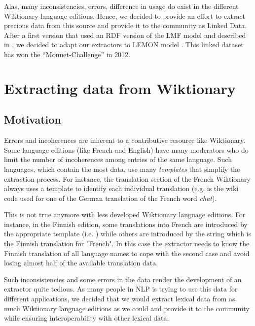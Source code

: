 \documentclass[sw]{iosart2c}
\newcommand{\ffbox}[1]{%
  {%
   \setlength{\fboxsep}{-2\fboxrule}%
   \fbox{\hspace{1.2pt}\strut#1\hspace{1.2pt}}%
  }%
}
\begin{document}
Alas, many inconsistencies, errors, difference in usage do exist in the different Wiktionary language editions. Hence, we decided to provide an effort to extract precious data from this source and provide it to the community as Linked Data. After a first version that used an RDF version of the LMF model \cite{FRANCOPOULO:2006:INRIA-00121468:1,francopoulo-EtAl:2006:MLRI} and described in \cite{serasset:lrec2012}, we decided to adapt our extractors to LEMON model \cite{McRae-lemon:2012}. This linked dataset has won the ``Monnet-Challenge'' in 2012.

\section{Extracting data from Wiktionary}

\subsection{Motivation}

Errors and incoherences are inherent to a contributive resource like Wiktionary. Some language editions (like French and English) have many moderators who do limit the number of incoherences among entries of the same language. Such languages, which contain the most data, use many \textit{templates} that simplify the extraction process. For instance, the translation section of the French Wiktionary always uses a template to identify each individual translation (e.g. \ffbox{\texttt{\small \{\{trad+|de|Katze\}\} ''f''}} is the wiki code used for one of the German translation of the French word \emph{chat}).

This is not true anymore with less developed Wiktionary language editions. For instance, in the Finnish edition, some translations into French are introduced by the appropriate template (i.e. \ffbox{\texttt{\small\{\{fr\}\}}}) while others are introduced by the string \ffbox{\texttt{\small ranska}} which is the Finnish translation for "French". In this case the extractor needs to know the Finnish translation of all language names to cope with the second case and avoid losing almost half of the available translation data.

Such inconsistencies and some errors in the data render the development of an extractor quite tedious. As many people in NLP is trying to use this data for different applications, we decided that we would extract lexical data from as much Wiktionary language editions as we could and provide it to the community while ensuring interoperability with other lexical data.
\end{document}
